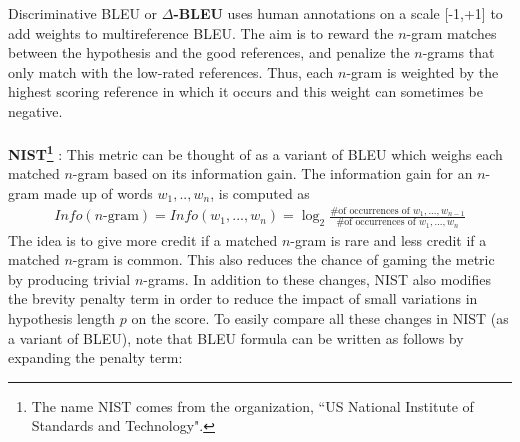 Discriminative BLEU or \textbf{$\Delta$-BLEU}  uses human annotations on a scale [-1,+1] to add weights to multireference BLEU. The aim is to reward the $n$-gram matches between the hypothesis and the good references, and penalize the $n$-grams that only match with the low-rated references. Thus, each $n$-gram is weighted by the highest scoring reference in which it occurs and this weight can sometimes be negative.\\
\\
\textbf{NIST\footnote{The name NIST comes from the organization, ``US National Institute of Standards and Technology".}} : This metric can be thought of as a variant of BLEU which weighs each matched $n$-gram based on its information gain. The information gain for an $n$-gram made up of words $w_1,..,w_n$, is computed  as
\begin{align*}
    Info(\text{$n$-gram}) = Info(w_1, ..., w_n) = \log_{2} \frac{\text{\# of occurrences of } w_1,...,w_{n-1}}{\text{\# of occurrences of } w_1,...,w_n }
\end{align*}
The idea is to give more credit if a matched $n$-gram is rare and less credit if a matched $n$-gram is common. This also reduces the chance of gaming the metric by producing trivial $n$-grams. 
In addition to these changes, NIST also modifies the brevity penalty term in order to reduce the impact of small variations in hypothesis length $p$ on the score. To easily compare all these changes in NIST (as a variant of BLEU), note that BLEU formula can be written as follows by expanding the penalty term:
